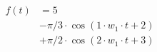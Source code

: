 \begin{center}
\begin{align*}
f(t) &= 5 \\
&- \pi/3 \cdot \cos( 1 \cdot w_1 \cdot t + 2 ) \\
&+ \pi/2 \cdot \cos( 2 \cdot w_1 \cdot t + 3 )
\end{align*}
\end{center}
